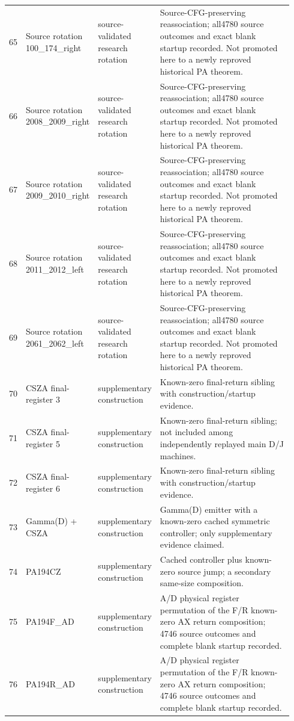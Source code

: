 \begin{longtable}{p{0.035\linewidth}p{0.23\linewidth}p{0.21\linewidth}p{0.47\linewidth}}
65 & Source rotation 100\_174\_right & source-validated research rotation & Source-CFG-preserving reassociation; all4780 source outcomes and exact blank startup recorded. Not promoted here to a newly reproved historical PA theorem.\\[4pt]
66 & Source rotation 2008\_2009\_right & source-validated research rotation & Source-CFG-preserving reassociation; all4780 source outcomes and exact blank startup recorded. Not promoted here to a newly reproved historical PA theorem.\\[4pt]
67 & Source rotation 2009\_2010\_right & source-validated research rotation & Source-CFG-preserving reassociation; all4780 source outcomes and exact blank startup recorded. Not promoted here to a newly reproved historical PA theorem.\\[4pt]
68 & Source rotation 2011\_2012\_left & source-validated research rotation & Source-CFG-preserving reassociation; all4780 source outcomes and exact blank startup recorded. Not promoted here to a newly reproved historical PA theorem.\\[4pt]
69 & Source rotation 2061\_2062\_left & source-validated research rotation & Source-CFG-preserving reassociation; all4780 source outcomes and exact blank startup recorded. Not promoted here to a newly reproved historical PA theorem.\\[4pt]
70 & CSZA final-register 3 & supplementary construction & Known-zero final-return sibling with construction/startup evidence.\\[4pt]
71 & CSZA final-register 5 & supplementary construction & Known-zero final-return sibling; not included among independently replayed main D/J machines.\\[4pt]
72 & CSZA final-register 6 & supplementary construction & Known-zero final-return sibling with construction/startup evidence.\\[4pt]
73 & Gamma(D) + CSZA & supplementary construction & Gamma(D) emitter with a known-zero cached symmetric controller; only supplementary evidence claimed.\\[4pt]
74 & PA194CZ & supplementary construction & Cached controller plus known-zero source jump; a secondary same-size composition.\\[4pt]
75 & PA194F\_AD & supplementary construction & A/D physical register permutation of the F/R known-zero AX return composition; 4746 source outcomes and complete blank startup recorded.\\[4pt]
76 & PA194R\_AD & supplementary construction & A/D physical register permutation of the F/R known-zero AX return composition; 4746 source outcomes and complete blank startup recorded.\\[4pt]

\end{longtable}
